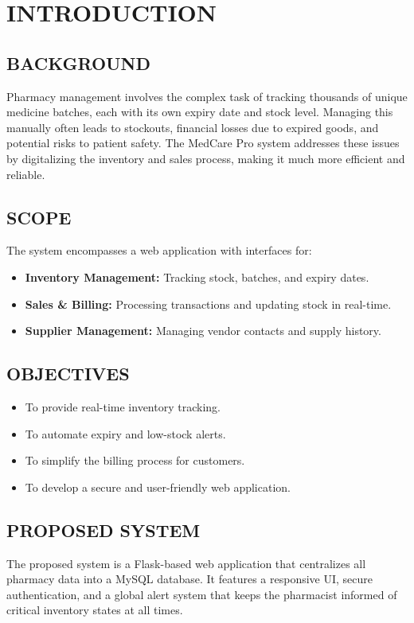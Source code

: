 \documentclass[12pt, a4paper]{report}
\begin{document}

\chapter{INTRODUCTION}

\section{BACKGROUND}
Pharmacy management involves the complex task of tracking thousands of unique medicine batches, each with its own expiry date and stock level. Managing this manually often leads to stockouts, financial losses due to expired goods, and potential risks to patient safety. The MedCare Pro system addresses these issues by digitalizing the inventory and sales process, making it much more efficient and reliable.

\section{SCOPE}
The system encompasses a web application with interfaces for:
\begin{itemize}
    \item \textbf{Inventory Management:} Tracking stock, batches, and expiry dates.
    \item \textbf{Sales \& Billing:} Processing transactions and updating stock in real-time.
    \item \textbf{Supplier Management:} Managing vendor contacts and supply history.
\end{itemize}

\section{OBJECTIVES}
\begin{itemize}
    \item To provide real-time inventory tracking.
    \item To automate expiry and low-stock alerts.
    \item To simplify the billing process for customers.
    \item To develop a secure and user-friendly web application.
\end{itemize}

\section{PROPOSED SYSTEM}
The proposed system is a Flask-based web application that centralizes all pharmacy data into a MySQL database. It features a responsive UI, secure authentication, and a global alert system that keeps the pharmacist informed of critical inventory states at all times.
\end{document}

